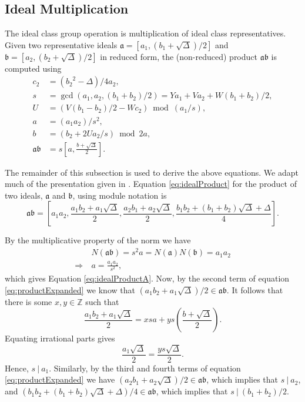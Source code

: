 \documentclass{ucalgthes1}
\theoremstyle{definition}
\newcommand{\ZZ}{\mathbb{Z}}
\newcommand{\ideal}{\mathfrak}
\begin{document}
\subsection{Ideal Multiplication}
\label{subsec:idealMultiply}

The ideal class group operation is multiplication of ideal class representatives. Given two representative ideals $\mathfrak a = [a_1, (b_1 + \sqrt{\Delta})/2]$ and $\mathfrak b = [a_2, (b_2 + \sqrt{\Delta})/2]$ in reduced form, the (non-reduced) product $\mathfrak a \mathfrak b$ is computed using
\begin{align}
	c_2 & = ({b_2}^2-\Delta)/4a_2, \nonumber \\
	s & = \gcd(a_1, a_2, (b_1+b_2)/2) = Ya_1 + Va_2 + W(b_1+b_2)/2,    \label{eq:idealProductS} \\
	U & = (V(b_1-b_2)/2 - Wc_2) \bmod{(a_1/s)},                        \label{eq:idealProductU} \\
	a & = (a_1a_2)/s^2,                                                \label{eq:idealProductA} \\
	b & = (b_2 + 2Ua_2/s) \bmod{2a},                                   \label{eq:idealProductB} \\
	\mathfrak a \mathfrak b & = s\left[a, \frac{b + \sqrt{\Delta}}{2}\right]. \nonumber
\end{align}

The remainder of this subsection is used to derive the above equations.  We adapt much of the presentation given in \cite[pp.117,118]{Jacobson2009}. Equation \ref{eq:idealProduct} for the product of two ideals, $\ideal a$ and $\ideal b$, using module notation is
\begin{equation}
\label{eq:productExpanded}
\mathfrak{a} \mathfrak{b} =
\left[ a_1a_2, \frac{a_1b_2 + a_1\sqrt{\Delta}}{2}, \frac{a_2b_1 + a_2\sqrt{\Delta}}{2}, \frac{b_1b_2 + (b_1+b_2)\sqrt{\Delta} + \Delta}{4} \right].
\end{equation}

\noindent
By the multiplicative property of the norm we have
\begin{align*}
	& N(\mathfrak{a}\mathfrak{b}) = s^2a = N(\mathfrak{a})N(\mathfrak{b}) = a_1 a_2 \\
	\Rightarrow~ & a = \frac{a_1a_2}{s^2},
\end{align*}
which gives Equation \ref{eq:idealProductA}. Now, by the second term of equation \eqref{eq:productExpanded} we know that $(a_1b_2 + a_1\sqrt{\Delta})/2 \in \mathfrak{a}\mathfrak{b}$.  It follows that there is some $x,y \in \ZZ$ such that
\[
	\frac{a_1b_2 + a_1\sqrt{\Delta}}{2} = xsa + ys\left(\frac{b+\sqrt{\Delta}}{2}\right).
\]
Equating irrational parts gives
\begin{equation*}
	\frac{a_1\sqrt{\Delta}}{2} = \frac{ys\sqrt{\Delta}}{2}.
\end{equation*}
\noindent
Hence, $s ~|~ a_1$.  Similarly, by the third and fourth terms of equation \eqref{eq:productExpanded} we have $(a_2b_1+a_2\sqrt{\Delta})/2 \in \mathfrak{a}\mathfrak{b}$, which implies that $s~|~a_2$, and $(b_1b_2 + (b_1+b_2)\sqrt{\Delta} + \Delta)/4 \in \mathfrak{a}\mathfrak{b}$, which implies that $s~|~(b_1+b_2)/2$. 
\end{document}
